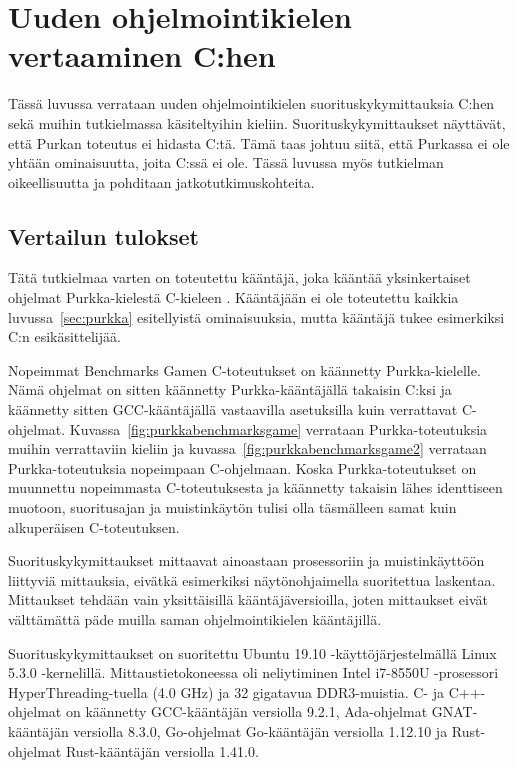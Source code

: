 \section{Uuden ohjelmointikielen vertaaminen C:hen}

Tässä luvussa verrataan uuden ohjelmointikielen suorituskykymittauksia C:hen
sekä muihin tutkielmassa käsiteltyihin kieliin. Suorituskykymittaukset
näyttävät, että Purkan toteutus ei hidasta C:tä. Tämä taas johtuu siitä, että
Purkassa ei ole yhtään ominaisuutta, joita C:ssä ei ole. Tässä luvussa myös
tutkielman oikeellisuutta ja pohditaan jatkotutkimuskohteita.

\subsection{Vertailun tulokset}
\label{sec:results}

Tätä tutkielmaa varten on toteutettu kääntäjä, joka kääntää yksinkertaiset
ohjelmat Purkka-kielestä C-kieleen \citep{purkka}. Kääntäjään ei ole toteutettu
kaikkia luvussa~\ref{sec:purkka} esitellyistä ominaisuuksia, mutta kääntäjä
tukee esimerkiksi C:n esikäsittelijää.

Nopeimmat Benchmarks Gamen C-toteutukset on käännetty Purkka-kielelle. Nämä
ohjelmat on sitten käännetty Purkka-kääntäjällä takaisin C:ksi ja käännetty
sitten GCC-kääntäjällä vastaavilla asetuksilla kuin verrattavat C-ohjelmat.
Kuvassa~\ref{fig:purkkabenchmarksgame} verrataan Purkka-toteutuksia muihin
verrattaviin kieliin ja kuvassa~\ref{fig:purkkabenchmarksgame2} verrataan
Purkka-toteutuksia nopeimpaan C-ohjelmaan. Koska Purkka-toteutukset on
muunnettu nopeimmasta C-toteutuksesta ja käännetty takaisin lähes identtiseen
muotoon, suoritusajan ja muistinkäytön tulisi olla täsmälleen samat kuin
alkuperäisen C-toteutuksen.

Suorituskykymittaukset mittaavat ainoastaan prosessoriin ja muistinkäyttöön
liittyviä mittauksia, eivätkä esimerkiksi näytönohjaimella suoritettua
laskentaa. Mittaukset tehdään vain yksittäisillä kääntäjäversioilla, joten
mittaukset eivät välttämättä päde muilla saman ohjelmointikielen kääntäjillä.

Suorituskykymittaukset on suoritettu Ubuntu 19.10 -käyttöjärjestelmällä Linux
5.3.0 -kernelillä. Mittaustietokoneessa oli neliytiminen Intel i7-8550U
-prosessori Hy\-per\-Thread\-ing-tuella (4.0 GHz) ja 32 gigatavua DDR3-muistia.
C- ja C++-ohjelmat on käännetty GCC-kääntäjän versiolla 9.2.1, Ada-ohjelmat
GNAT-kääntäjän versiolla 8.3.0, Go-ohjelmat Go-kääntäjän versiolla 1.12.10 ja Rust-ohjelmat
Rust-kääntäjän versiolla 1.41.0.

